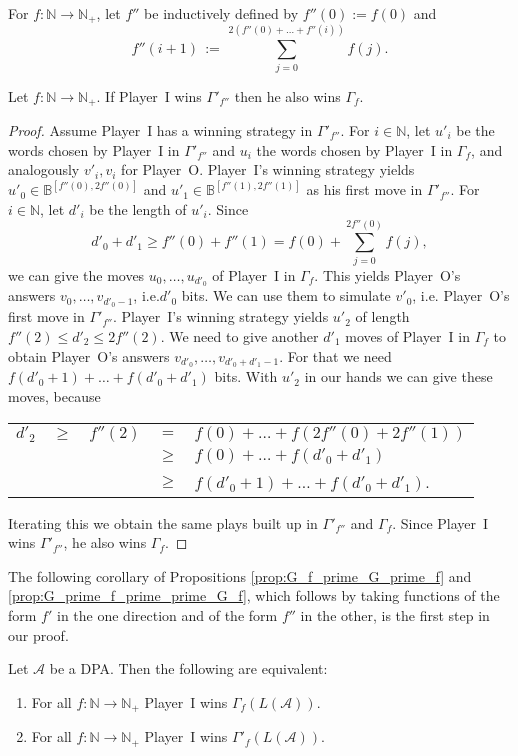 \documentclass[fleqn,envcountsame]{LMCS}
\newcommand{\aut}[1]{\ensuremath{\mathcal{#1}}}
\newcommand{\pI}{Player~I\xspace}
\newcommand{\pO}{Player~O\xspace}
\newcommand{\Gd}[1]{\ensuremath{\Gamma_{#1}}\xspace}
\newcommand{\GdLA}[1]{\ensuremath{\Gamma_{#1}(\LA)}\xspace}
\newcommand{\Gp}[1]{\ensuremath{\Gamma'_{#1}}\xspace}
\newcommand{\GpLA}[1]{\ensuremath{\Gamma'_{#1}(\LA)}\xspace}
\newcommand{\LA}{\ensuremath{L(\aut{A})}\xspace}
\newcommand{\Nat}{\ensuremath{\mathbb{N}}\xspace}
\newcommand{\Natp}{\ensuremath{\mathbb{N}_+}\xspace}
\newcommand{\B}{\ensuremath{\mathbb{B}}\xspace}
\newcommand{\ie}{i.e.\xspace}
\begin{document}
For $f:\Nat\to\Natp$, let $f''$ be inductively defined by $f''(0):=f(0)$
and \[ f''(i+1) \, := \, \sum\limits_{j=0}^{2(f''(0)+\ldots+f''(i))}f(j). \]
\begin{prop}\label{prop:G_prime_f_prime_prime_G_f}
Let $f:\Nat\to\Natp$. If \pI wins \Gp{f''} then he also wins \Gd{f}.
\end{prop}
\begin{proof}
Assume \pI has a winning strategy in \Gp{f''}. For $i\in\Nat$, let
$u'_i$ be the words chosen by \pI in \Gp{f''} and $u_i$ the words
chosen by \pI in \Gd{f}, and analogously $v'_i,v_i$  for \pO.
\pI's winning strategy yields $u'_0\in\B^{[f''(0),2f''(0)]}$ and
$u'_1\in\B^{[f''(1),2f''(1)]}$ as his first move in \Gp{f''}.
For $i\in\Nat$, let $d'_i$ be the length of $u'_i$.
Since
\[ d'_0+d'_1\geq f''(0)+f''(1)=f(0)+\sum\limits_{j=0}^{2f''(0)}f(j), \]
we can give the moves $u_0,\ldots,u_{d'_0}$ of \pI in \Gd{f}. This
yields \pO's answers $v_0,\ldots,v_{d'_0-1}$, \ie $d'_0$ bits. We
can use them to simulate $v'_0$, \ie \pO's first move in
\Gp{f''}. \pI's winning strategy yields $u'_2$ of length $f''(2)\leq
d'_2\leq2f''(2)$. We need to give another $d'_1$ moves of \pI in
\Gd{f} to obtain \pO's answers $v_{d'_0},\ldots,v_{d'_0+d'_1-1}$. For
that we need $f(d'_0+1)+\ldots+f(d'_0+d'_1)$ bits. With $u'_2$ in our
hands we can give these moves, because
\begin{center}
\begin{tabular}{rcccl}
$d'_2$ & $\geq$ & $f''(2)$ & $=$ & $f(0)+\ldots+f(2f''(0)+2f''(1))$\\
	& & & $\geq$ & $f(0)+\ldots+f(d'_0+d'_1)$\\
	& & & $\geq$ & $f(d'_0+1)+\ldots+f(d'_0+d'_1)$.
\end{tabular}
\end{center}
Iterating this we obtain the same plays built up in \Gp{f''} and
\Gd{f}. Since \pI wins \Gp{f''}, he also wins \Gd{f}.
\end{proof}

The following corollary of Propositions \ref{prop:G_f_prime_G_prime_f} and
\ref{prop:G_prime_f_prime_prime_G_f}, which follows by taking functions of
the form $f'$ in the one direction and of the form $f''$ in the other,
is the first step in our proof.

\begin{cor}\label{cor:equivalence_all_Gf_all_G_prime_f}
Let \aut{A} be a DPA. Then the following are equivalent:
\begin{enumerate}[\em(1)]
\item For all $f:\Nat\to\Natp$ \pI wins \GdLA{f}.
\item For all $f:\Nat\to\Natp$ \pI wins \GpLA{f}.
\end{enumerate}
\end{cor}
\end{document}
